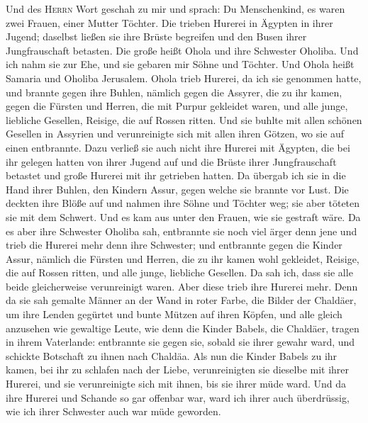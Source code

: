  Und des \textsc{Herrn} Wort geschah zu mir und sprach:
 Du Menschenkind, es waren zwei Frauen, einer Mutter
Töchter.  Die trieben Hurerei in Ägypten in ihrer Jugend;
daselbst ließen sie ihre Brüste begreifen und den Busen ihrer
Jungfrauschaft betasten.  Die große heißt Ohola und ihre
Schwester Oholiba. Und ich nahm sie zur Ehe, und sie gebaren mir Söhne
und Töchter. Und Ohola heißt Samaria und Oholiba Jerusalem.
 Ohola trieb Hurerei, da ich sie genommen hatte, und
brannte gegen ihre Buhlen, nämlich gegen die Assyrer, die zu ihr kamen,
 gegen die Fürsten und Herren, die mit Purpur gekleidet
waren, und alle junge, liebliche Gesellen, Reisige, die auf Rossen
ritten.  Und sie buhlte mit allen schönen Gesellen in
Assyrien und verunreinigte sich mit allen ihren Götzen, wo sie auf einen
entbrannte.  Dazu verließ sie auch nicht ihre Hurerei mit
Ägypten, die bei ihr gelegen hatten von ihrer Jugend auf und die Brüste
ihrer Jungfrauschaft betastet und große Hurerei mit ihr getrieben
hatten.  Da übergab ich sie in die Hand ihrer Buhlen, den
Kindern Assur, gegen welche sie brannte vor Lust.  Die
deckten ihre Blöße auf und nahmen ihre Söhne und Töchter weg; sie aber
töteten sie mit dem Schwert. Und es kam aus unter den Frauen, wie sie
gestraft wäre.  Da es aber ihre Schwester Oholiba sah,
entbrannte sie noch viel ärger denn jene und trieb die Hurerei mehr denn
ihre Schwester;  und entbrannte gegen die Kinder Assur,
nämlich die Fürsten und Herren, die zu ihr kamen wohl gekleidet,
Reisige, die auf Rossen ritten, und alle junge, liebliche Gesellen.
 Da sah ich, dass sie alle beide gleicherweise
verunreinigt waren.  Aber diese trieb ihre Hurerei mehr.
Denn da sie sah gemalte Männer an der Wand in roter Farbe, die Bilder
der Chaldäer,  um ihre Lenden gegürtet und bunte Mützen
auf ihren Köpfen, und alle gleich anzusehen wie gewaltige Leute, wie
denn die Kinder Babels, die Chaldäer, tragen in ihrem Vaterlande:
 entbrannte sie gegen sie, sobald sie ihrer gewahr ward,
und schickte Botschaft zu ihnen nach Chaldäa.  Als nun
die Kinder Babels zu ihr kamen, bei ihr zu schlafen nach der Liebe,
verunreinigten sie dieselbe mit ihrer Hurerei, und sie verunreinigte
sich mit ihnen, bis sie ihrer müde ward.  Und da ihre
Hurerei und Schande so gar offenbar war, ward ich ihrer auch
überdrüssig, wie ich ihrer Schwester auch war müde geworden.

